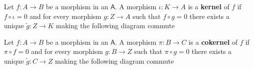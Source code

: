 \documentclass[../../main]{subfiles}
\begin{document}
\begin{definition}[Kernel] \label{def:categorical-kernel}
  Let \(f: A \to B\) be a morphism in an  \(\mathsf{A}\).
  A morphism \(\iota: K \to A\) is a \textbf{kernel} of \(f\) if \(f \circ \iota = 0\) and for every morphism \(g: Z \to A\) such that \(f \circ g = 0\) there exists a unique \(\tilde{g}:Z \to K\) making the following diagram commute
  \begin{center}
  \end{center}
\end{definition}

\begin{definition}[Cokernel] \label{def:categorical-cokernel}
  Let \(f: A \to B\) be a morphism in an  \(\mathsf{A}\).
  A morphism \(\pi: B \to C\) is a \textbf{cokernel} of \(f\) if \(\pi \circ f = 0\) and for every morphism \(g: B \to Z\) such that \(\pi \circ g = 0\) there exists a unique \(\tilde{g}:C \to Z\) making the following diagram commute
  \begin{center}
  \end{center}
\end{definition}
\end{document}
